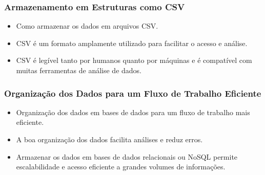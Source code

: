 \documentclass{beamer}
\begin{document}
\begin{frame}
  \frametitle{Armazenamento em Estruturas como CSV}
  \begin{itemize}
    \item Como armazenar os dados em arquivos CSV.
    \item CSV é um formato amplamente utilizado para facilitar o acesso e análise.
    \item CSV é legível tanto por humanos quanto por máquinas e é compatível com muitas ferramentas de análise de dados.
  \end{itemize}
\end{frame}

\begin{frame}
  \frametitle{Organização dos Dados para um Fluxo de Trabalho Eficiente}
  \begin{itemize}
    \item Organização dos dados em bases de dados para um fluxo de trabalho mais eficiente.
    \item A boa organização dos dados facilita análises e reduz erros.
    \item Armazenar os dados em bases de dados relacionais ou NoSQL permite escalabilidade e acesso eficiente a grandes volumes de informações.
  \end{itemize}
\end{frame}
\end{document}
